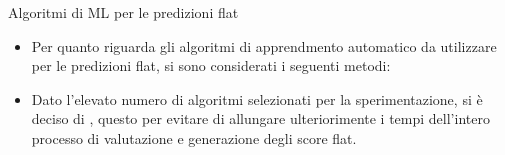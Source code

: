 \documentclass[9pt]{beamer}
\begin{document}
\begin{tframe}{Algoritmi di ML per le predizioni flat}
\begin{itemize}
\item Per quanto riguarda gli algoritmi di apprendmento automatico da utilizzare per le predizioni flat, si sono considerati i seguenti metodi:
\item Dato l'elevato numero di algoritmi selezionati per la sperimentazione, si è deciso di , questo per evitare di allungare ulteriorimente i tempi dell'intero processo di valutazione e generazione degli score flat.
\end{itemize}
\end{tframe}
\end{document}
